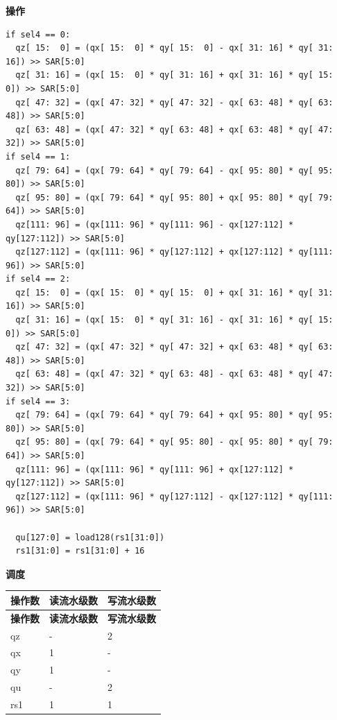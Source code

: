 \textbf{操作}
\begin{lstlisting}
if sel4 == 0:
  qz[ 15:  0] = (qx[ 15:  0] * qy[ 15:  0] - qx[ 31: 16] * qy[ 31: 16]) >> SAR[5:0]
  qz[ 31: 16] = (qx[ 15:  0] * qy[ 31: 16] + qx[ 31: 16] * qy[ 15:  0]) >> SAR[5:0]
  qz[ 47: 32] = (qx[ 47: 32] * qy[ 47: 32] - qx[ 63: 48] * qy[ 63: 48]) >> SAR[5:0]
  qz[ 63: 48] = (qx[ 47: 32] * qy[ 63: 48] + qx[ 63: 48] * qy[ 47: 32]) >> SAR[5:0]
if sel4 == 1:
  qz[ 79: 64] = (qx[ 79: 64] * qy[ 79: 64] - qx[ 95: 80] * qy[ 95: 80]) >> SAR[5:0]
  qz[ 95: 80] = (qx[ 79: 64] * qy[ 95: 80] + qx[ 95: 80] * qy[ 79: 64]) >> SAR[5:0]
  qz[111: 96] = (qx[111: 96] * qy[111: 96] - qx[127:112] * qy[127:112]) >> SAR[5:0]
  qz[127:112] = (qx[111: 96] * qy[127:112] + qx[127:112] * qy[111: 96]) >> SAR[5:0]
if sel4 == 2:
  qz[ 15:  0] = (qx[ 15:  0] * qy[ 15:  0] + qx[ 31: 16] * qy[ 31: 16]) >> SAR[5:0]
  qz[ 31: 16] = (qx[ 15:  0] * qy[ 31: 16] - qx[ 31: 16] * qy[ 15:  0]) >> SAR[5:0]
  qz[ 47: 32] = (qx[ 47: 32] * qy[ 47: 32] + qx[ 63: 48] * qy[ 63: 48]) >> SAR[5:0]
  qz[ 63: 48] = (qx[ 47: 32] * qy[ 63: 48] - qx[ 63: 48] * qy[ 47: 32]) >> SAR[5:0]
if sel4 == 3:
  qz[ 79: 64] = (qx[ 79: 64] * qy[ 79: 64] + qx[ 95: 80] * qy[ 95: 80]) >> SAR[5:0]
  qz[ 95: 80] = (qx[ 79: 64] * qy[ 95: 80] - qx[ 95: 80] * qy[ 79: 64]) >> SAR[5:0]
  qz[111: 96] = (qx[111: 96] * qy[111: 96] + qx[127:112] * qy[127:112]) >> SAR[5:0]
  qz[127:112] = (qx[111: 96] * qy[127:112] - qx[127:112] * qy[111: 96]) >> SAR[5:0]

  qu[127:0] = load128(rs1[31:0])
  rs1[31:0] = rs1[31:0] + 16
\end{lstlisting}

\textbf{调度}\\
\begin{longtable}[c]{|l|l|l|}
    \hline
    \rowcolor{lightgray}
    \textbf{操作数} & \textbf{读流水级数} & \textbf{写流水级数} \\\hline
    \endfirsthead
    \hline
    \rowcolor{lightgray}
     \textbf{操作数} & \textbf{读流水级数} & \textbf{写流水级数} \\\hline
    \endhead
    \hline
    \endfoot


    qz & - & 2 \\\hline
     qx & 1 & - \\\hline
     qy & 1 & - \\\hline
     qu & - & 2 \\\hline
     rs1 & 1 & 1

\end{longtable}

